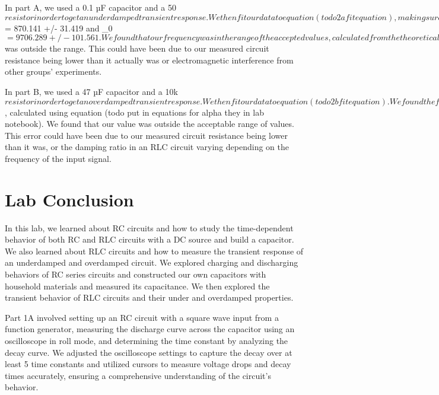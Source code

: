 \documentclass[11pt]{article}
\let\oldsection\section
\renewcommand\section{\clearpage\oldsection}
\begin{document}
    In part A, we used a  0.1 µF capacitor and a 50 \Omega$ resistor in order to get an underdamped transient response. We then fit our data to equation (todo 2a fit equation), making sure to account for the fact that this is an equation for currently by dividing our voltages by the total resistance. We found the fit parameters \alpha$ = 870.141 +/- 31.419 and \omega_0$ = 9706.289 +/- 101.561. We found that our frequency was in the range of the accepted values, calculated from the theoretical values, however, our value for \alpha$ was outside the range. This could have been due to our measured circuit resistance being lower than it actually was or electromagnetic interference from other groups’ experiments.

    In part B, we used a 47 µF capacitor and a 10k \Omega$ resistor in order to get an overdamped transient response. We then fit our data to equation (todo 2b fit equation). We found the fit parameters A = 0.980 +/- 0.011 and D = 1518.932 +/- 30.657. We focused on our value for D, comparing it to the theoretical value for \alpha$, calculated using equation (todo put in equations for alpha they in lab notebook). We found that our value was outside the acceptable range of values. This error could have been due to our measured circuit resistance being lower than it was, or the damping ratio in an RLC circuit varying depending on the frequency of the input signal.

    \section{Lab Conclusion}\label{sec:conclusion}
    In this lab, we learned about RC circuits and how to study the time-dependent behavior of both RC and RLC circuits with a DC source and build a capacitor. We also learned about RLC circuits and how to measure the transient response of an underdamped and overdamped circuit. We explored charging and discharging behaviors of RC series circuits and constructed our own capacitors with household materials and measured its capacitance. We then explored the transient behavior of RLC circuits and their under and overdamped properties.

    Part 1A involved setting up an RC circuit with a square wave input from a function generator, measuring the discharge curve across the capacitor using an oscilloscope in roll mode, and determining the time constant by analyzing the decay curve. We adjusted the oscilloscope settings to capture the decay over at least 5 time constants and utilized cursors to measure voltage drops and decay times accurately, ensuring a comprehensive understanding of the circuit's behavior.
    
\end{document}
